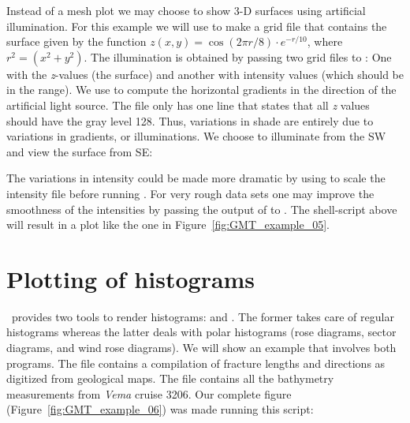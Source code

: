 Instead of a mesh plot we may choose to show 3-D surfaces using
artificial illumination.  For this example we will use
 to make a grid file that contains the surface given
by the function $z(x, y) = \cos (2\pi r/8)\cdot e^{-r/10}$, where
$r^2 = (x^2 + y^2)$.  The illumination is obtained by passing
two grid files to : One with the \emph{z}-values
(the surface) and another with intensity values (which should
be in the  range).  We use  to compute
the horizontal gradients in the direction of the artificial
light source.  The  file only has one line that states
that all \emph{z} values should have the gray level 128.  Thus,
variations in shade are entirely due to variations in gradients,
or illuminations.  We choose to illuminate from the SW and view
the surface from SE:


The variations in intensity could be made more dramatic by
using  to scale the intensity file before
running .  For very rough data sets one may
improve the smoothness of the intensities by passing the
output of  to .  The
shell-script above will result in a plot like the one in
Figure~\ref{fig:GMT_example_05}.



\section{Plotting of histograms}

\GMT\ provides two tools to render histograms: 
and .  The former takes care of regular histograms
whereas the latter deals with polar histograms (rose diagrams,
sector diagrams, and wind rose diagrams).  We will show an
example that involves both programs.  The file 
contains a compilation of fracture lengths and directions as
digitized from geological maps.  The file  contains
all the bathymetry measurements from \emph{Vema} cruise 3206.
Our complete figure (Figure~\ref{fig:GMT_example_06}) was made running
this script:



